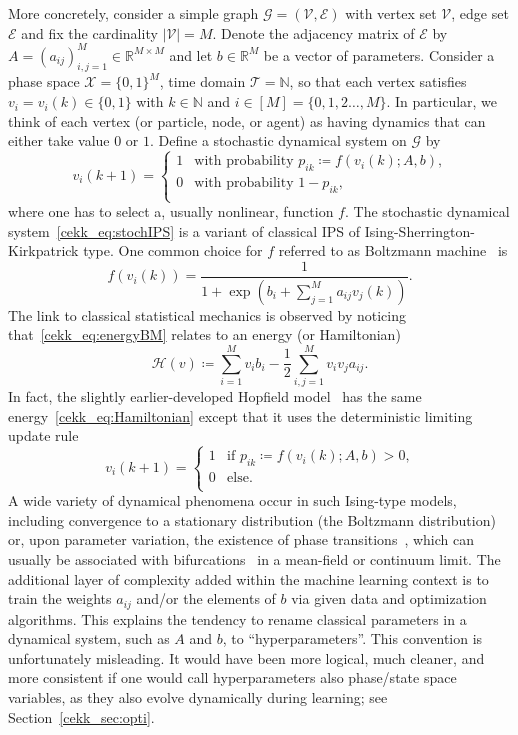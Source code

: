 \documentclass[10pt]{article}
\newcommand{\R}{{\mathbb R}}
\newcommand{\N}{{\mathbb N}}
\def\R{\mathbb{R}}
\def\N{\mathbb{N}}
\def\cE{\mathcal{E}}
\def\cG{\mathcal{G}}
\def\cT{\mathcal{T}}
\def\cV{\mathcal{V}}
\def\cX{\mathcal{X}}
\newcommand{\be}{\begin{equation}}
\newcommand{\ee}{\end{equation}}
\begin{document}
More concretely, consider a simple graph $\cG=(\cV,\cE)$ with vertex set $\cV$, edge set $\cE$ and fix the cardinality $|\cV|=M$. Denote the adjacency matrix of $\cE$ by $A=(a_{ij})_{i,j=1}^M\in\R^{M\times M}$ and let $b\in\R^M$ be a vector of parameters. Consider a phase space $\cX=\{0,1\}^M$, time domain $\cT=\N$, so that each vertex satisfies $v_i=v_i(k)\in\{0,1\}$ with $k\in\N$ and $i\in[M]=\{0,1,2\ldots,M\}$. In particular, we think of each vertex (or particle, node, or agent) as having dynamics that can either take value $0$ or $1$. Define a stochastic
dynamical system on $\cG$ by
\be
\label{cekk_eq:stochIPS}
v_i(k+1)=\left\{
\begin{array}{ll}
	1 & \text{with probability $p_{ik}\coloneqq f(v_i(k);A,b)$,}\\
	0 & \text{with probability $1-p_{ik}$,}\\
\end{array}
\right.
\ee 
where one has to select a, usually nonlinear, function $f$. The stochastic dynamical system~\eqref{cekk_eq:stochIPS} is a variant of classical IPS of Ising-Sherrington-Kirkpatrick type. One common choice for $f$ referred to as Boltzmann machine~\cite{AckleyHintonSejnowski} is  
\be
\label{cekk_eq:energyBM}
f(v_i(k))=\frac{1}{1+\exp(b_i+\sum_{j=1}^M a_{ij}v_j(k))}.
\ee
The link to classical statistical mechanics is observed by noticing that~\eqref{cekk_eq:energyBM} relates to an energy (or Hamiltonian) 
\be
\label{cekk_eq:Hamiltonian}
\mathcal{H}(v)\coloneqq\sum_{i=1}^M v_i b_i -\frac12 \sum_{i,j=1}^M v_i v_j a_{ij}.
\ee
In fact, the slightly earlier-developed Hopfield model~\cite{Hopfield} has the same energy~\eqref{cekk_eq:Hamiltonian} except that it uses the deterministic limiting update rule
\be
\label{cekk_eq:stochIPS1}
v_i(k+1)=\left\{
\begin{array}{ll}
	1 & \text{if $p_{ik}\coloneqq f(v_i(k);A,b)>0$,}\\
	0 & \text{else.}\\
\end{array}
\right.
\ee 
A wide variety of dynamical phenomena occur in such Ising-type models, including convergence to a stationary distribution (the Boltzmann distribution) or, upon parameter variation, the existence of phase transitions~\cite{Goldenfeld}, which can usually be associated with bifurcations~\cite{GH,Kuznetsov} in a mean-field or continuum limit. The additional layer of complexity added within the machine learning context is to train the weights $a_{ij}$ and/or the elements of $b$ via given data and optimization algorithms. This explains the tendency to rename classical parameters in a dynamical system, such as $A$ and $b$, to ``hyperparameters''. This convention is unfortunately misleading. It would have been more logical, much cleaner, and more consistent if one would call hyperparameters also phase/state space variables, as they also evolve dynamically during learning; see Section~\ref{cekk_sec:opti}. 
\end{document}
